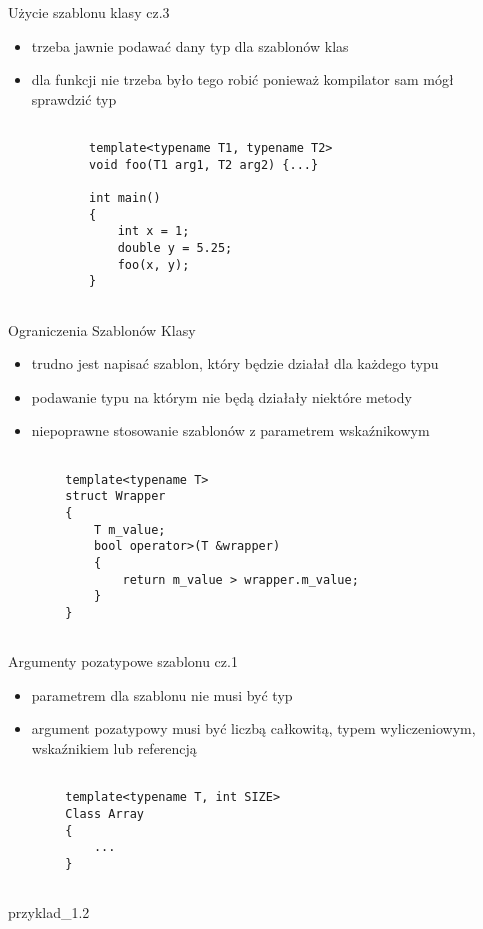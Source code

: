 \documentclass[11pt]{beamer}
\begin{document}
\begin{frame}[fragile]{Użycie szablonu klasy cz.3}
	\begin{itemize}
		\item trzeba jawnie podawać dany typ dla szablonów klas
		\item dla funkcji nie trzeba było tego robić ponieważ kompilator sam mógł sprawdzić typ
		
	\begin{lstlisting}[frame=single]  % Start your code-block
		
		template<typename T1, typename T2>
		void foo(T1 arg1, T2 arg2) {...}
		
		int main()
		{
			int x = 1;
			double y = 5.25;
			foo(x, y);
		}
		
	\end{lstlisting}
	\end{itemize}
\end{frame}



\begin{frame}[fragile]{Ograniczenia Szablonów Klasy}
	\begin{itemize}
		\item trudno jest napisać szablon, który będzie działał dla każdego typu
		\item podawanie typu na którym nie będą działały niektóre metody
		\item niepoprawne stosowanie szablonów z parametrem wskaźnikowym
	\end{itemize}
	
	\begin{lstlisting}[frame=single]  % Start your code-block
		
		template<typename T>
		struct Wrapper 
		{
			T m_value;
			bool operator>(T &wrapper)
			{
				return m_value > wrapper.m_value;
			} 
		}	
		
	\end{lstlisting}
	
\end{frame}



\begin{frame}[fragile]{Argumenty pozatypowe szablonu cz.1}
	\begin{itemize}
		\item parametrem dla szablonu nie musi być typ
		\item argument pozatypowy musi być liczbą całkowitą, typem wyliczeniowym, wskaźnikiem lub referencją
	\end{itemize}
	
	\begin{lstlisting}[frame=single]  % Start your code-block
		
		template<typename T, int SIZE>
		Class Array 
		{
			...
		}
		
	\end{lstlisting}
	\alert{przyklad\_1.2}
\end{frame}
\end{document}
